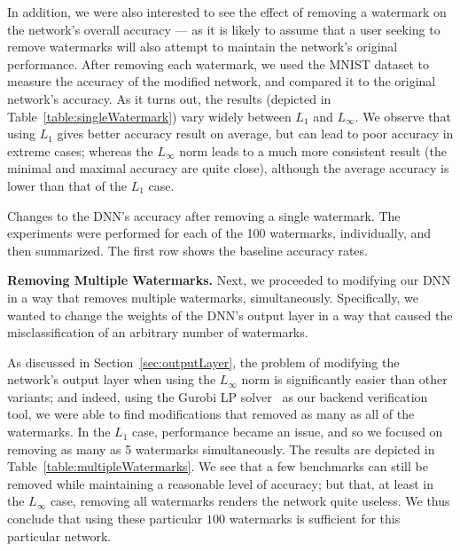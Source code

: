 \documentclass{easychair}
\begin{document}
In addition, we were also interested to see the effect of removing a
watermark on the network's overall accuracy --- as it is likely to
assume that a user seeking to remove watermarks will also attempt to
maintain the network's original performance. After removing each
watermark, we used the MNIST dataset to measure the accuracy of the
modified network, and compared it to the original network's accuracy. As it turns out, the
results (depicted in Table~\ref{table:singleWatermark})
vary widely between $L_1$ and $L_\infty$. We observe that using 
$L_1$ gives better accuracy result on average, but can lead to poor
accuracy in extreme cases; whereas the $L_\infty$ norm leads to a much
more consistent result (the minimal and maximal
accuracy are quite close), although the average accuracy is lower than
that of the $L_1$ case. 

\begin{table}
\caption{Changes to the DNN's accuracy after removing a single
  watermark. The experiments were performed for each of the
  100 watermarks, individually, and then summarized. The first row
  shows the baseline accuracy rates.}
\label{table:singleWatermark}
\end{table}

\medskip\noindent \textbf{Removing Multiple Watermarks.}
Next, we proceeded to modifying our DNN in a way that
removes multiple watermarks, simultaneously. Specifically, we wanted
to change the weights of the DNN's output layer in a way that caused
the misclassification of an arbitrary number of watermarks.

As discussed in Section~\ref{sec:outputLayer}, the problem of modifying the network's
output layer when using the $L_\infty$ norm is significantly easier
than other variants; and indeed, using the Gurobi LP solver~\cite{gurobi} as our backend
verification tool, we were able to find modifications
that removed as many as all of the watermarks. In the $L_1$ case,
performance became an issue, and so we focused on removing as many as
5 watermarks simultaneously. The results are depicted in
Table~\ref{table:multipleWatermarks}. We see that a few benchmarks can
still be removed while maintaining a reasonable level of accuracy; but
that, at least in the $L_\infty$ case, removing all watermarks renders
the network quite useless. We thus conclude that using these particular $100$
watermarks is sufficient for this particular network.
\end{document}
